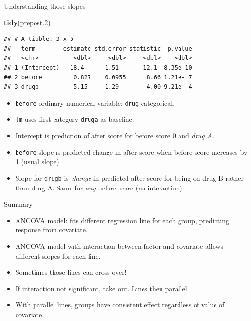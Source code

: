 \documentclass[ignorenonframetext,]{beamer}
\newenvironment{Shaded}{\begin{snugshade}}{\end{snugshade}}
\newcommand{\FloatTok}[1]{\textcolor[rgb]{0.00,0.00,0.81}{#1}}
\newcommand{\KeywordTok}[1]{\textcolor[rgb]{0.13,0.29,0.53}{\textbf{#1}}}
\newcommand{\NormalTok}[1]{#1}
\begin{document}
\begin{frame}[fragile]{Understanding those slopes}
\protect\hypertarget{understanding-those-slopes}{}

\footnotesize

\begin{Shaded}
\begin{Highlighting}[]
\KeywordTok{tidy}\NormalTok{(prepost}\FloatTok{.2}\NormalTok{)}
\end{Highlighting}
\end{Shaded}

\begin{verbatim}
## # A tibble: 3 x 5
##   term        estimate std.error statistic  p.value
##   <chr>          <dbl>     <dbl>     <dbl>    <dbl>
## 1 (Intercept)   18.4      1.51       12.1  8.35e-10
## 2 before         0.827    0.0955      8.66 1.21e- 7
## 3 drugb         -5.15     1.29       -4.00 9.21e- 4
\end{verbatim}

\normalsize

\begin{itemize}
\item
  \texttt{before} ordinary numerical variable; \texttt{drug}
  categorical.
\item
  \texttt{lm} uses first category \texttt{druga} as baseline.
\item
  Intercept is prediction of after score for before score 0 and
  \emph{drug A}.
\item
  \texttt{before} slope is predicted change in after score when before
  score increases by 1 (usual slope)
\item
  Slope for \texttt{drugb} is \emph{change} in predicted after score for
  being on drug B rather than drug A. Same for \emph{any} before score
  (no interaction).
\end{itemize}

\end{frame}

\begin{frame}{Summary}
\protect\hypertarget{summary}{}

\begin{itemize}
\item
  ANCOVA model: fits different regression line for each group,
  predicting response from covariate.
\item
  ANCOVA model with interaction between factor and covariate allows
  different slopes for each line.
\item
  Sometimes those lines can cross over!
\item
  If interaction not significant, take out. Lines then parallel.
\item
  With parallel lines, groups have consistent effect regardless of value
  of covariate.
\end{itemize}

\end{frame}
\end{document}
